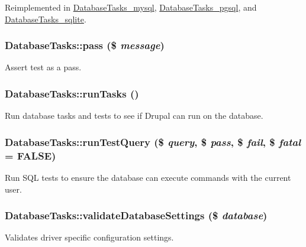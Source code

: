 Reimplemented in \hyperlink{classDatabaseTasks__mysql_ab8f790cc6df5bbde06325da137da7030}{DatabaseTasks\_\-mysql}, \hyperlink{classDatabaseTasks__pgsql_afe779086f177b48b3441372136e2d560}{DatabaseTasks\_\-pgsql}, and \hyperlink{classDatabaseTasks__sqlite_ad31220279e6cbec9d248a66e8b51fe2f}{DatabaseTasks\_\-sqlite}.\hypertarget{classDatabaseTasks_ab95a2718467b938c7116b5d2feeb9a4c}{
\subsubsection[{pass}]{\setlength{\rightskip}{0pt plus 5cm}DatabaseTasks::pass (\$ {\em message})}}
\label{classDatabaseTasks_ab95a2718467b938c7116b5d2feeb9a4c}
Assert test as a pass. \hypertarget{classDatabaseTasks_a02a8ac31c7ed2c7798732ef5cf8482d0}{
\subsubsection[{runTasks}]{\setlength{\rightskip}{0pt plus 5cm}DatabaseTasks::runTasks ()}}
\label{classDatabaseTasks_a02a8ac31c7ed2c7798732ef5cf8482d0}
Run database tasks and tests to see if Drupal can run on the database. \hypertarget{classDatabaseTasks_a53da139c1b17ae90a0f6df6dd003c0ca}{
\subsubsection[{runTestQuery}]{\setlength{\rightskip}{0pt plus 5cm}DatabaseTasks::runTestQuery (\$ {\em query}, \/  \$ {\em pass}, \/  \$ {\em fail}, \/  \$ {\em fatal} = {\ttfamily FALSE})}}
\label{classDatabaseTasks_a53da139c1b17ae90a0f6df6dd003c0ca}
Run SQL tests to ensure the database can execute commands with the current user. \hypertarget{classDatabaseTasks_a44116b4f564f8fcfdd5ade73853419b8}{
\subsubsection[{validateDatabaseSettings}]{\setlength{\rightskip}{0pt plus 5cm}DatabaseTasks::validateDatabaseSettings (\$ {\em database})}}
\label{classDatabaseTasks_a44116b4f564f8fcfdd5ade73853419b8}
Validates driver specific configuration settings.

